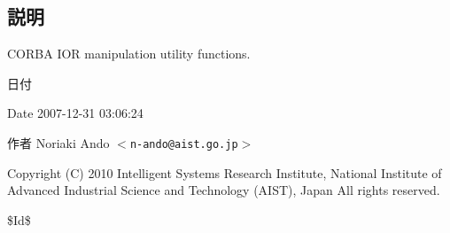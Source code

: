 \subsection{説明}
CORBA IOR manipulation utility functions. \begin{DoxyDate}{日付}

\end{DoxyDate}
\begin{DoxyParagraph}{Date}
2007-\/12-\/31 03:06:24 
\end{DoxyParagraph}
\begin{DoxyAuthor}{作者}
Noriaki Ando $<${\tt n-\/ando@aist.go.jp}$>$
\end{DoxyAuthor}
Copyright (C) 2010 Intelligent Systems Research Institute, National Institute of Advanced Industrial Science and Technology (AIST), Japan All rights reserved.

\$Id\$ 